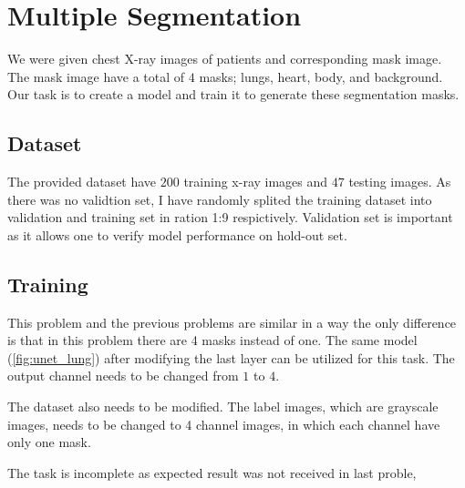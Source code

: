 \section{Multiple Segmentation}
\label{sec:warmup6}

    We were given chest X-ray images of patients and corresponding mask image. The mask image have a total of $4$ masks; lungs, heart, body, and background. Our task is to create a model and train it to generate these segmentation masks.

\subsection{Dataset}
    The provided dataset have $200$ training x-ray images and $47$ testing images. As there was no validtion set, I have randomly splited the training dataset into validation and training set in ration 1:9 respictively. Validation set is important as it allows one to verify model performance on hold-out set.

\subsection{Training}

    This problem and the previous problems are similar in a way the only difference is that in this problem there are 4 masks instead of one. The same model (\cref{fig:unet_lung}) after modifying the last layer can be utilized for this task. The output channel needs to be changed from $1$ to $4$. 
    
    The dataset also needs to be modified. The label images, which are grayscale images, needs to be changed to 4 channel images, in which each channel have only one mask. 

    The task is incomplete as expected result was not received in last proble,